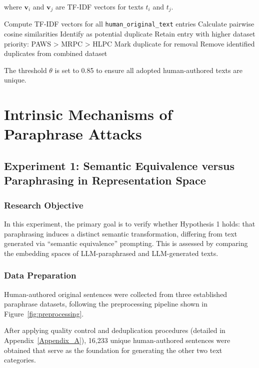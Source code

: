 where $\mathbf{v}_i$ and $\mathbf{v}_j$ are TF-IDF vectors for texts $t_i$ and $t_j$.

\begin{algorithm}[H]
\caption{Deduplication Process}
\label{algo:deduplication}
\begin{algorithmic}[1]
\STATE Compute TF-IDF vectors for all \texttt{human\_original\_text} entries
\STATE Calculate pairwise cosine similarities
    \STATE Identify as potential duplicate
    \STATE Retain entry with higher dataset priority: PAWS > MRPC > HLPC
    \STATE Mark duplicate for removal
\ENDFOR
\STATE Remove identified duplicates from combined dataset
\end{algorithmic}
\end{algorithm}

The threshold $\theta$ is set to 0.85 to ensure all adopted human-authored texts are unique.

\section{Intrinsic Mechanisms of Paraphrase Attacks}

\subsection{Experiment 1: Semantic Equivalence versus Paraphrasing in Representation Space}
\label{app:experiment1}

\subsubsection{Research Objective}
In this experiment, the primary goal is to verify whether Hypothesis 1 holds: that paraphrasing induces a distinct semantic transformation, differing from text generated via ``semantic equivalence'' prompting. This is assessed by comparing the embedding spaces of LLM-paraphrased and LLM-generated texts.

\subsubsection{Data Preparation}

Human-authored original sentences were collected from three established paraphrase datasets, following the preprocessing pipeline shown in Figure~\ref{fig:preprocessing}.

After applying quality control and deduplication procedures (detailed in Appendix~\ref{Appendix_A}), 16,233 unique human-authored sentences were obtained that serve as the foundation for generating the other two text categories.


